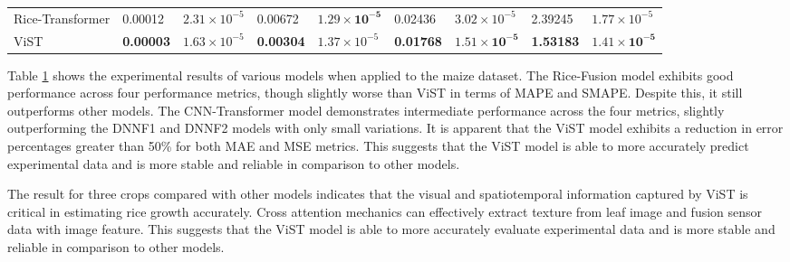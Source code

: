 \documentclass[acmsmall,manuscript, screen, review]{acmart}
\begin{document}
\begin{table}[htbp]
\begin{tabular}{lllllllll}
    Rice-Transformer & 0.00012 & \begin{math}2.31\times 10^{-5}\end{math} & 0.00672 & \begin{math}\mathbf{1.29\times 10^{-5}}\end{math} & 0.02436 & \begin{math}3.02\times 10^{-5}\end{math} & 2.39245 & \begin{math}1.77\times 10^{-5}\end{math} \\
    ViST  & \textbf{0.00003} & \begin{math}1.63\times 10^{-5}\end{math} & \textbf{0.00304} & \begin{math}1.37\times 10^{-5}\end{math} & \textbf{0.01768} & \begin{math}\mathbf{1.51\times 10^{-5}}\end{math} & \textbf{1.53183} & \begin{math}\mathbf{1.41\times 10^{-5}}\end{math} \\
    \bottomrule
    \end{tabular}%
  \label{tab:maize_results}%
\end{table}%


Table \ref{tab:maize_results} shows the experimental results of various models when applied to the maize dataset. The Rice-Fusion model exhibits good performance across four performance metrics, though slightly worse than ViST in terms of MAPE and SMAPE. Despite this, it still outperforms other models. The CNN-Transformer model demonstrates intermediate performance across the four metrics, slightly outperforming the DNNF1 and DNNF2 models with only small variations. It is apparent that the ViST model exhibits a reduction in error percentages greater than 50\% for both MAE and MSE metrics. This suggests that the ViST model is able to more accurately predict experimental data and is more stable and reliable in comparison to other models.

The result for three crops compared with other models indicates that the visual and spatiotemporal information captured by ViST is critical in estimating rice growth accurately. Cross attention mechanics can effectively extract texture from leaf image and fusion sensor data with image feature.  This suggests that the ViST model is able to more accurately evaluate experimental data and is more stable and reliable in comparison to other models.
\end{document}
